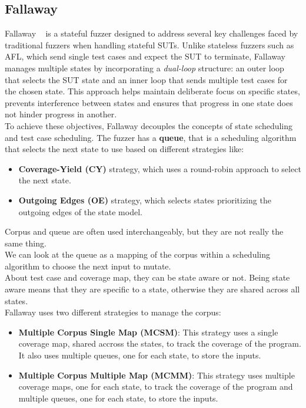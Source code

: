 \subsection{Fallaway}
Fallaway ~\cite{Fallaway} is a stateful fuzzer designed to address several key challenges faced by traditional fuzzers when handling stateful SUTs. Unlike stateless fuzzers such as AFL, which send single test cases and expect the SUT to terminate, Fallaway manages multiple states by incorporating a \textit{dual-loop} structure: an outer loop that selects the SUT state and an inner loop that sends multiple test cases for the chosen state. This approach helps maintain deliberate focus on specific states, prevents interference between states and ensures that progress in one state does not hinder progress in another.
\\To achieve these objectives, Fallaway decouples the concepts of state scheduling and test case scheduling.
The fuzzer has a \textbf{queue}, that is a scheduling algorithm that selects the next state to use based on different strategies like:
\begin{itemize}
    \item \textbf{Coverage-Yield (CY)} strategy, which uses a round-robin approach to select the next state.
    \item \textbf{Outgoing Edges (OE)} strategy, which selects states prioritizing the outgoing edges of the state model.
\end{itemize} 
Corpus and queue are often used interchangeably, but they are not really the same thing. \\We can look at the queue as a mapping of the corpus within a scheduling algorithm to choose the next input to mutate.
\\About test case and coverage map, they can be state aware or not. Being state aware means that they are specific to a state, otherwise they are shared across all states.
\\Fallaway uses two different strategies to manage the corpus:
\begin{itemize}
    \item \textbf{Multiple Corpus Single Map (MCSM)}: This strategy uses a single coverage map, shared accross the states, to track the coverage of the program. It also uses multiple queues, one for each state, to store the inputs.
    
    \item \textbf{Multiple Corpus Multiple Map (MCMM)}: This strategy uses multiple coverage maps, one for each state, to track the coverage of the program and multiple queues, one for each state, to store the inputs.
\end{itemize}
